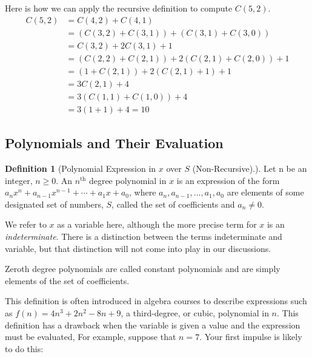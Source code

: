\documentclass[10pt,]{book}
\theoremstyle{plain}
\theoremstyle{definition}
\newtheorem{definition}[theorem]{Definition}
\theoremstyle{definition}
\theoremstyle{definition}
\theoremstyle{definition}
\numberwithin{equation}{section}
\begin{document}
%
\par
Here is how we can apply the recursive definition to compute \(C(5,2)\).
\begin{equation*}
\begin{split}
C(5,2) &=C(4,2)+C(4,1)\\
			&=(C(3,2)+C(3,1))+(C(3,1)+C(3,0))\\
			&=C(3,2) +2 C(3,1) + 1\\
			&=(C(2,2)+C(2,1))+ 2(C(2,1)+C(2,0))+1\\
			&=(1+C(2,1))+ 2( C(2,1)  + 1) + 1\\
			&=3 C(2,1) + 4\\
			&=3(C(1,1) + C(1,0)) + 4\\
			&=3(1+1)+4 = 10
\end{split}
\end{equation*}
%
\typeout{************************************************}
\typeout{************************************************}
\subsection[Polynomials and Their Evaluation]{Polynomials and Their Evaluation}\label{ss-polynomials-and-their-evaluation}
\begin{definition}[Polynomial Expression in \(x\) over \(S\) (Non-Recursive).]\label{def-polynomial-expression-nonrecursive}
Let n be an integer, \(n\geq 0\). An \(n^{\text{th}}\) degree polynomial in \(x\) is an expression of the form \(a_nx^n+ a_{n-1}x^{n-1}+ \cdots  + a_1x+a_0\), where \(a_n, a_{n-1},\ldots ,a_1,a_0\) are elements of some designated set of numbers, \(S\), called the set of coefficients and \(a_n\neq 0\).%
\end{definition}
We refer to \(x\) as a variable here, although the more precise term for \(x\) is an \emph{indeterminate}. There is a distinction
between the terms indeterminate and variable, but that distinction will not come into play in our discussions.%
\par
Zeroth degree polynomials are called constant polynomials and are simply elements of the set of coefficients.%
\par
This definition is often introduced in algebra courses to describe expressions such as \(f(n) = 4n^3 + 2n^2 - 8n + 9\), a third-degree,
or cubic, polynomial in \(n\). This definition has a drawback when the variable is given a value and the expression must be evaluated, For example, suppose that \(n = 7\). Your first impulse is likely to do this:
\end{document}
